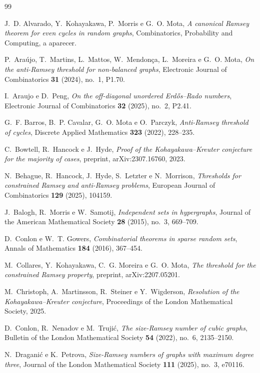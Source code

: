 \documentclass[11pt,a4paper]{article}
\theoremstyle{plain}
\theoremstyle{definition}
\begin{document}
\begin{thebibliography}{99}

  J.~D. Alvarado, Y.~Kohayakawa, P.~Morris e G.~O. Mota,
  \emph{A canonical Ramsey theorem for even cycles in random graphs},
  Combinatorics, Probability and Computing, a aparecer.

  P.~Araújo, T.~Martins, L.~Mattos, W.~Mendonça, L.~Moreira e G.~O. Mota,
  \emph{On the anti-Ramsey threshold for non-balanced graphs},
  Electronic Journal of Combinatorics \textbf{31} (2024), no.~1, P1.70.

  I.~Araujo e D.~Peng,
  \emph{On the off-diagonal unordered Erdős--Rado numbers},
  Electronic Journal of Combinatorics \textbf{32} (2025), no.~2, P2.41.

  G.~F. Barros, B.~P. Cavalar, G.~O. Mota e O.~Parczyk,
  \emph{Anti-Ramsey threshold of cycles},
  Discrete Applied Mathematics \textbf{323} (2022), 228--235.

  C.~Bowtell, R.~Hancock e J.~Hyde,
  \emph{Proof of the {Kohayakawa--Kreuter} conjecture for the majority of cases},
  preprint, arXiv:2307.16760, 2023.

  N.~Behague, R.~Hancock, J.~Hyde, S.~Letzter e N.~Morrison,
  \emph{Thresholds for constrained Ramsey and anti-Ramsey problems},
  European Journal of Combinatorics \textbf{129} (2025), 104159.

  J.~Balogh, R.~Morris e W.~Samotij,
  \emph{Independent sets in hypergraphs},
  Journal of the American Mathematical Society \textbf{28} (2015), no.~3, 669--709.

  D.~Conlon e W.~T. Gowers,
  \emph{Combinatorial theorems in sparse random sets},
  Annals of Mathematics \textbf{184} (2016), 367--454.

  M.~Collares, Y.~Kohayakawa, C.~G. Moreira e G.~O. Mota,
  \emph{The threshold for the constrained Ramsey property},
  preprint, arXiv:2207.05201.

  M.~Christoph, A.~Martinsson, R.~Steiner e Y.~Wigderson,
  \emph{Resolution of the Kohayakawa--Kreuter conjecture},
  Proceedings of the London Mathematical Society, 2025.

  D.~Conlon, R.~Nenadov e M.~Truji\'c,
  \emph{The size-{Ramsey} number of cubic graphs},
  Bulletin of the London Mathematical Society \textbf{54} (2022), no.~6, 2135--2150.

  N.~Dragani\'c e K.~Petrova,
  \emph{Size-{Ramsey} numbers of graphs with maximum degree three},
  Journal of the London Mathematical Society \textbf{111} (2025), no.~3, e70116.


\end{thebibliography}
\end{document}
